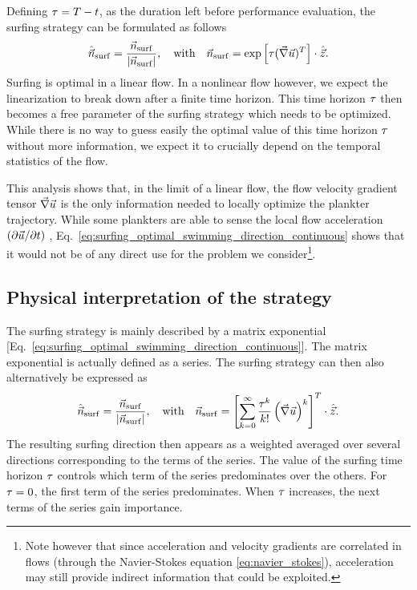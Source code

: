 Defining $\tau = T - t$, as the duration left before performance evaluation, the surfing strategy can be formulated as follows
\begin{equation}
	\label{eq:surfing_optimal_swimming_direction_continuous}
	\hat{\vec{n}}_{\mathrm{surf}} = \frac{\vec{n}_{\mathrm{surf}}}{\lvert\vec{n}_{\mathrm{surf}}\rvert}, \quad \text{with} \quad \vec{n}_{\mathrm{surf}} = \exp \left[ \tau (\vec{\nabla} \vec{u})^T \right] \cdot \hat{\vec{z}}.
\end{equation}
Surfing is optimal in a linear flow. 
In a nonlinear flow however, we expect the linearization to break down after a finite time horizon.
This time horizon $\tau$ then becomes a free parameter of the surfing strategy which needs to be optimized.
While there is no way to guess easily the optimal value of this time horizon $\tau$ without more information, we expect it to crucially depend on the temporal statistics of the flow.

This analysis shows that, in the limit of a linear flow, the flow velocity gradient tensor $\vec{\nabla} \vec{u}$ is the only information needed to locally optimize the plankter trajectory. 
While some plankters are able to sense the local flow acceleration $\left({\partial \vec{u}}/{\partial t} \right)$ \citep{fuchs2015hydrodynamic,fuchs2018waves}, Eq.~\eqref{eq:surfing_optimal_swimming_direction_continuous} shows that it would not be of any direct use for the problem we consider\footnote{Note however that since acceleration and velocity gradients are correlated in flows (through the Navier-Stokes equation \ref{eq:navier_stokes}), acceleration may still provide indirect information that could be exploited.}.

\subsection{Physical interpretation of the strategy}\label{sec:the_surfing_strategy_interpretation}

The surfing strategy is mainly described by a matrix exponential [Eq.~\eqref{eq:surfing_optimal_swimming_direction_continuous}].
The matrix exponential is actually defined as a series.
The surfing strategy can then also alternatively be expressed as
\begin{equation}
	\hat{\vec{n}}_{\mathrm{surf}} = \frac{\vec{n}_{\mathrm{surf}}}{\lvert\vec{n}_{\mathrm{surf}}\rvert}, \quad \text{with} \quad 
	\vec{n}_{\mathrm{surf}} = \left[ \sum_{k = 0}^{\infty} \frac{\tau^k}{k!}  \left( \vec{\nabla} \vec{u} \right)^k \right]^T \cdot \hat{\vec{z}}.
\end{equation}
The resulting surfing direction then appears as a weighted averaged over several directions corresponding to the terms of the series.
The value of the surfing time horizon $\tau$ controls which term of the series predominates over the others.
For $\tau = 0$, the first term of the series predominates. 
When $\tau$ increases, the next terms of the series gain importance.

